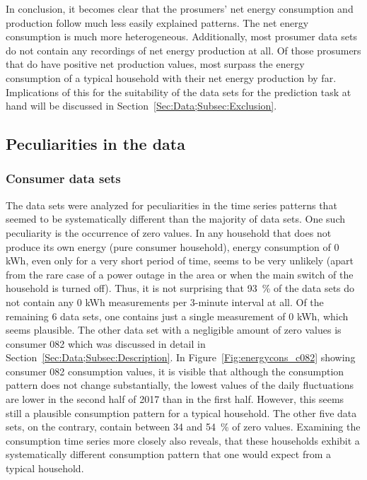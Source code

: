 In conclusion, it becomes clear that the prosumers' net energy consumption and production follow much less easily explained patterns. The net energy consumption is much more heterogeneous. Additionally, most prosumer data sets do not contain any recordings of net energy production at all. Of those prosumers that do have positive net production values, most surpass the energy consumption of a typical household with their net energy production by far. Implications of this for the suitability of the data sets for the prediction task at hand will be discussed in Section~\ref{Sec:Data;Subsec:Exclusion}.


\subsection{Peculiarities in the data}\label{Sec:Data;Subsec:Peculiarities}

\subsubsection{Consumer data sets}

The data sets were analyzed for peculiarities in the time series patterns that seemed to be systematically different than the majority of data sets. One such peculiarity is the occurrence of zero values. In any household that does not produce its own energy (pure consumer household), energy consumption of 0 kWh, even only for a very short period of time, seems to be very unlikely (apart from the rare case of a power outage in the area or when the main switch of the household is turned off). Thus, it is not surprising that 93~\% of the data sets do not contain any 0 kWh measurements per 3-minute interval at all. Of the remaining 6 data sets, one contains just a single measurement of 0 kWh, which seems plausible. The other data set with a negligible amount of zero values is consumer 082 which was discussed in detail in Section~\ref{Sec:Data;Subsec:Description}. In Figure~\ref{Fig:energycons_c082} showing consumer 082 consumption values, it is visible that although the consumption pattern does not change substantially, the lowest values of the daily fluctuations are lower in the second half of 2017 than in the first half. However, this seems still a plausible consumption pattern for a typical household. The other five data sets, on the contrary, contain between 34 and 54~\% of zero values. Examining the consumption time series more closely also reveals, that these households exhibit a systematically different consumption pattern that one would expect from a typical household.

